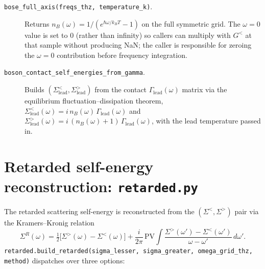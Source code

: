 \begin{description}
  \item[\texttt{bose\_full\_axis(freqs\_thz, temperature\_k)}.] Returns
        $n_B(\omega) = 1/(e^{\hbar\omega/k_BT}-1)$ on the full
        symmetric grid.  The $\omega = 0$ value is set to $0$ (rather
        than infinity) so callers can multiply with $G^<$ at that
        sample without producing NaN; the caller is responsible for
        zeroing the $\omega=0$ contribution before frequency
        integration.
  \item[\texttt{boson\_contact\_self\_energies\_from\_gamma}.]  Builds
        $(\Sigma^<_\mathrm{lead}, \Sigma^>_\mathrm{lead})$ from the
        contact $\Gamma_\mathrm{lead}(\omega)$ matrix via the
        equilibrium fluctuation--dissipation theorem,
        $\Sigma^<_\mathrm{lead}(\omega) = i\,n_B(\omega)\,\Gamma_\mathrm{lead}(\omega)$
        and
        $\Sigma^>_\mathrm{lead}(\omega) = i\,(n_B(\omega)+1)\,\Gamma_\mathrm{lead}(\omega)$,
        with the lead temperature passed in.
\end{description}

\section{Retarded self-energy reconstruction: \texttt{retarded.py}}
\label{sec:retarded}

The retarded scattering self-energy is reconstructed from the
$(\Sigma^<, \Sigma^>)$ pair via the Kramers--Kronig relation
\begin{equation}\label{eq:retarded_kk}
  \Sigma^R(\omega)
  = \tfrac{1}{2}\bigl[\Sigma^>(\omega) - \Sigma^<(\omega)\bigr]
  + \frac{i}{2\pi}\,\mathrm{PV}\!\!\int\frac{\Sigma^>(\omega')-\Sigma^<(\omega')}{\omega-\omega'}\,d\omega'.
\end{equation}
\texttt{retarded.build\_retarded(sigma\_lesser, sigma\_greater,
omega\_grid\_thz, method)} dispatches over three options:

